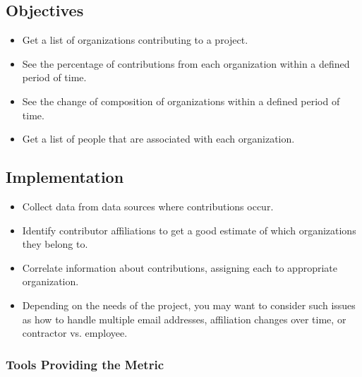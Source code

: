 \documentclass[
  12pt,
]{article}
\providecommand{\tightlist}{%
  \setlength{\itemsep}{0pt}\setlength{\parskip}{0pt}}
\begin{document}
\hypertarget{objectives-9}{%
\subsection{Objectives}\label{objectives-9}}

\begin{itemize}
\tightlist
\item
  Get a list of organizations contributing to a project.
\item
  See the percentage of contributions from each organization within a
  defined period of time.
\item
  See the change of composition of organizations within a defined period
  of time.
\item
  Get a list of people that are associated with each organization.
\end{itemize}

\hypertarget{implementation-9}{%
\subsection{Implementation}\label{implementation-9}}

\begin{itemize}
\tightlist
\item
  Collect data from data sources where contributions occur.
\item
  Identify contributor affiliations to get a good estimate of which
  organizations they belong to.
\item
  Correlate information about contributions, assigning each to
  appropriate organization.
\item
  Depending on the needs of the project, you may want to consider such
  issues as how to handle multiple email addresses, affiliation changes
  over time, or contractor vs. employee.
\end{itemize}

\hypertarget{tools-providing-the-metric-7}{%
\subsubsection{Tools Providing the
Metric}\label{tools-providing-the-metric-7}}
\end{document}
